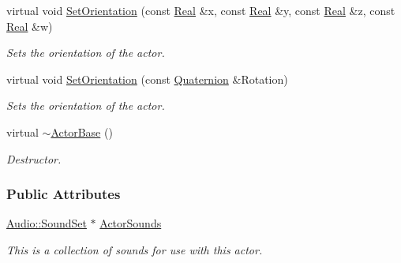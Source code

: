 \begin{DoxyCompactItemize}
virtual void \hyperlink{classMezzanine_1_1ActorBase_a9ea0aea47c70df747b62de1908a6e248}{SetOrientation} (const \hyperlink{namespaceMezzanine_a726731b1a7df72bf3583e4a97282c6f6}{Real} \&x, const \hyperlink{namespaceMezzanine_a726731b1a7df72bf3583e4a97282c6f6}{Real} \&y, const \hyperlink{namespaceMezzanine_a726731b1a7df72bf3583e4a97282c6f6}{Real} \&z, const \hyperlink{namespaceMezzanine_a726731b1a7df72bf3583e4a97282c6f6}{Real} \&w)
\begin{DoxyCompactList}\small\item\em Sets the orientation of the actor. \item\end{DoxyCompactList}\item 
virtual void \hyperlink{classMezzanine_1_1ActorBase_a71611580c9265bc87ad34c122e8246a0}{SetOrientation} (const \hyperlink{classMezzanine_1_1Quaternion}{Quaternion} \&Rotation)
\begin{DoxyCompactList}\small\item\em Sets the orientation of the actor. \item\end{DoxyCompactList}\item 
virtual \hyperlink{classMezzanine_1_1ActorBase_a0b49f2bc589504c908ccc47a635e1e79}{$\sim$ActorBase} ()
\begin{DoxyCompactList}\small\item\em Destructor. \item\end{DoxyCompactList}\end{DoxyCompactItemize}
\subsubsection*{Public Attributes}
\begin{DoxyCompactItemize}
\item 
\hypertarget{classMezzanine_1_1ActorBase_a55fc2cfb5d2754657fdb9a821504f9bf}{
\hyperlink{classMezzanine_1_1Audio_1_1SoundSet}{Audio::SoundSet} $\ast$ \hyperlink{classMezzanine_1_1ActorBase_a55fc2cfb5d2754657fdb9a821504f9bf}{ActorSounds}}
\label{classMezzanine_1_1ActorBase_a55fc2cfb5d2754657fdb9a821504f9bf}

\begin{DoxyCompactList}\small\item\em This is a collection of sounds for use with this actor. \item\end{DoxyCompactList}\end{DoxyCompactItemize}
